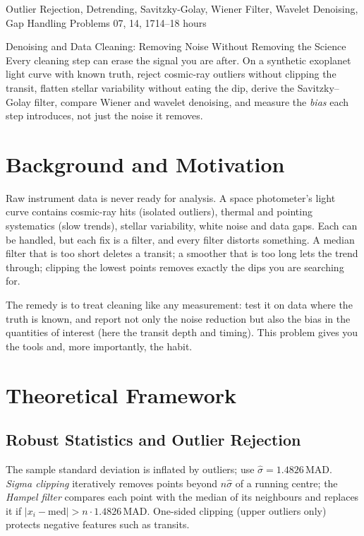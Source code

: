 \documentclass[11pt,a4paper]{article}
\begin{document}
%
{Outlier Rejection, Detrending, Savitzky-Golay, Wiener Filter, Wavelet Denoising, Gap Handling}%
{Problems 07, 14, 17}{14--18 hours}

\begin{summarybox}{Denoising and Data Cleaning: Removing Noise Without Removing the Science}
Every cleaning step can erase the signal you are after. On a synthetic exoplanet light curve with known truth, reject cosmic-ray outliers without clipping the transit, flatten stellar variability without eating the dip, derive the Savitzky--Golay filter, compare Wiener and wavelet denoising, and measure the \emph{bias} each step introduces, not just the noise it removes.
\end{summarybox}


\section*{Background and Motivation}
Raw instrument data is never ready for analysis. A space photometer's light curve contains cosmic-ray hits (isolated outliers), thermal and pointing systematics (slow trends), stellar variability, white noise and data gaps. Each can be handled, but each fix is a filter, and every filter distorts something. A median filter that is too short deletes a transit; a smoother that is too long lets the trend through; clipping the lowest points removes exactly the dips you are searching for.

The remedy is to treat cleaning like any measurement: test it on data where the truth is known, and report not only the noise reduction but also the bias in the quantities of interest (here the transit depth and timing). This problem gives you the tools and, more importantly, the habit.

\section*{Theoretical Framework}
\subsection{Robust Statistics and Outlier Rejection}
The sample standard deviation is inflated by outliers; use $\hat\sigma=1.4826\,\mathrm{MAD}$. \emph{Sigma clipping} iteratively removes points beyond $n\hat\sigma$ of a running centre; the \emph{Hampel filter} compares each point with the median of its neighbours and replaces it if $|x_i-\mathrm{med}|>n\cdot1.4826\,\mathrm{MAD}$. One-sided clipping (upper outliers only) protects negative features such as transits.
\end{document}
